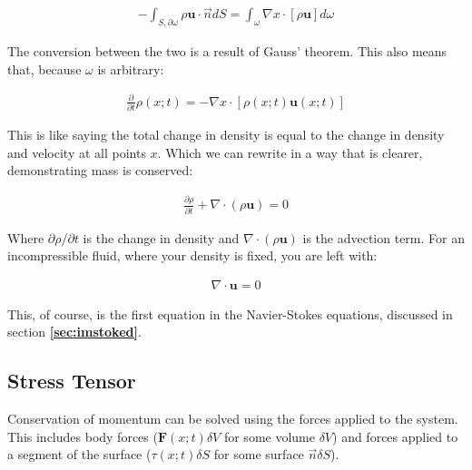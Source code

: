 \begin{equation} \label{phenom1}
\begin{split}
-\int_{S,\partial\omega}
\rho \mathbf{u} \cdot \Vec{n}dS = \int_\omega \nabla x \cdot [\rho \mathbf{u}]d\omega
\end{split}
\end{equation}


The conversion between the two is a result of Gauss' theorem. This also means that, because $\omega$ is arbitrary: 

\begin{equation} \label{phenom1}
\begin{split}
\frac{\partial}{\partial t}\rho(x;t) = -\nabla x\cdot [\rho(x;t)\mathbf{u}(x;t)]
\end{split}
\end{equation}

This is like saying the total change in density is equal to the change in density and velocity at all points $x$. Which we can rewrite in a way that is clearer, demonstrating mass is conserved: 


\begin{equation} \label{phenom1}
\begin{split}
\frac{\partial \rho}{\partial t} + \nabla \cdot (\rho \mathbf{u}) = 0
\end{split}
\end{equation}

Where $\partial \rho / \partial t$ is the change in density and $\nabla \cdot (\rho \mathbf{u})$ is the advection term. For an incompressible fluid, where your density is fixed, you are left with:

\begin{equation} \label{phenom1}
\begin{split}
 \nabla \cdot \mathbf{u} = 0
\end{split}
\end{equation}

This, of course, is the first equation in the Navier-Stokes equations, discussed in section \textbf{\ref{sec:imstoked}}.\newline

\subsection{Stress Tensor}

Conservation of momentum can be solved using the forces applied to the system. This includes body forces ($\mathbf{F}(x;t)\delta V$ for some volume $\delta V$) and forces applied to a segment of the surface ($\tau(x;t)\delta S$ for some surface $\Vec{n}\delta S$).\newline 

